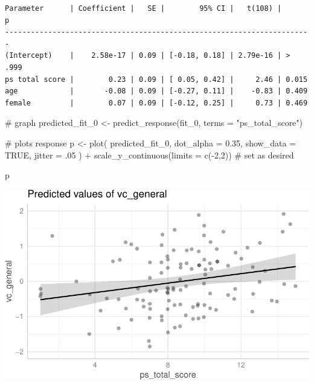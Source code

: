 \documentclass[
  single column]{article}
\newenvironment{Shaded}{\begin{snugshade}}{\end{snugshade}}
\newcommand{\AttributeTok}[1]{\textcolor[rgb]{0.40,0.45,0.13}{#1}}
\newcommand{\CommentTok}[1]{\textcolor[rgb]{0.37,0.37,0.37}{#1}}
\newcommand{\ConstantTok}[1]{\textcolor[rgb]{0.56,0.35,0.01}{#1}}
\newcommand{\DecValTok}[1]{\textcolor[rgb]{0.68,0.00,0.00}{#1}}
\newcommand{\FloatTok}[1]{\textcolor[rgb]{0.68,0.00,0.00}{#1}}
\newcommand{\FunctionTok}[1]{\textcolor[rgb]{0.28,0.35,0.67}{#1}}
\newcommand{\NormalTok}[1]{\textcolor[rgb]{0.00,0.23,0.31}{#1}}
\newcommand{\OtherTok}[1]{\textcolor[rgb]{0.00,0.23,0.31}{#1}}
\newcommand{\SpecialCharTok}[1]{\textcolor[rgb]{0.37,0.37,0.37}{#1}}
\newcommand{\StringTok}[1]{\textcolor[rgb]{0.13,0.47,0.30}{#1}}
\begin{document}
\begin{verbatim}
Parameter      | Coefficient |   SE |        95% CI |   t(108) |      p
-----------------------------------------------------------------------
(Intercept)    |    2.58e-17 | 0.09 | [-0.18, 0.18] | 2.79e-16 | > .999
ps total score |        0.23 | 0.09 | [ 0.05, 0.42] |     2.46 | 0.015 
age            |       -0.08 | 0.09 | [-0.27, 0.11] |    -0.83 | 0.409 
female         |        0.07 | 0.09 | [-0.12, 0.25] |     0.73 | 0.469 
\end{verbatim}

\begin{Shaded}
\begin{Highlighting}[]
\CommentTok{\# graph}
\NormalTok{predicted\_fit\_0 }\OtherTok{\textless{}{-}} \FunctionTok{predict\_response}\NormalTok{(fit\_0, }\AttributeTok{terms =} \StringTok{"ps\_total\_score"}\NormalTok{)}


\CommentTok{\# plots response}
\NormalTok{p }\OtherTok{\textless{}{-}} \FunctionTok{plot}\NormalTok{( }
\NormalTok{  predicted\_fit\_0, }
  \AttributeTok{dot\_alpha =} \FloatTok{0.35}\NormalTok{,}
  \AttributeTok{show\_data =} \ConstantTok{TRUE}\NormalTok{,}
  \AttributeTok{jitter =}\NormalTok{ .}\DecValTok{05}
\NormalTok{  )  }\SpecialCharTok{+}  \FunctionTok{scale\_y\_continuous}\NormalTok{(}\AttributeTok{limits =} \FunctionTok{c}\NormalTok{(}\SpecialCharTok{{-}}\DecValTok{2}\NormalTok{,}\DecValTok{2}\NormalTok{)) }\CommentTok{\# set as desired}

\NormalTok{p}
\end{Highlighting}
\end{Shaded}

\includegraphics{comments-on-b-murphy-thesis-by-jb_files/figure-pdf/analysis-1.pdf}
\end{document}

